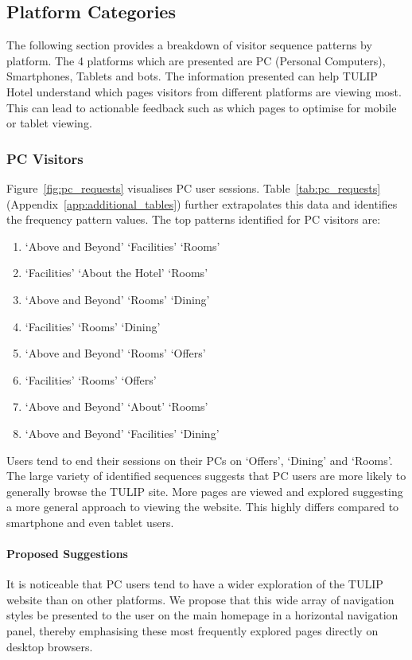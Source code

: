 \subsection{Platform Categories}
\label{sec:results:platform}

The following section provides a breakdown of visitor sequence patterns by platform. The 4 platforms which are presented are PC (Personal Computers), Smartphones, Tablets and bots. The information presented can help TULIP Hotel understand which pages visitors from different platforms are viewing most. This can lead to actionable feedback such as which pages to optimise for mobile or tablet viewing.

\subsubsection{PC Visitors}
\label{sec:results:platform:pc}

Figure~\ref{fig:pc_requests} visualises PC user sessions. Table~\ref{tab:pc_requests}  (Appendix~\ref{app:additional_tables}) further extrapolates this data and identifies the frequency pattern values. The top patterns identified for PC visitors are:

\begin{enumerate}
  \item `Above and Beyond' \ra{} `Facilities' \ra{} `Rooms'
  \item `Facilities' \ra{} `About the Hotel' \ra{} `Rooms'
  \item `Above and Beyond' \ra{} `Rooms' \ra{} `Dining'
  \item `Facilities' \ra{} `Rooms' \ra{} `Dining'
  \item `Above and Beyond' \ra{} `Rooms' \ra{} `Offers'
  \item `Facilities' \ra{} `Rooms' \ra{} `Offers'
  \item `Above and Beyond' \ra{} `About' \ra{} `Rooms'
  \item `Above and Beyond' \ra{} `Facilities' \ra{} `Dining'
\end{enumerate}

Users tend to end their sessions on their PCs on `Offers', `Dining' and `Rooms'. The large variety of identified sequences suggests that PC users are more likely to generally browse the TULIP site. More pages are viewed and explored suggesting a more general approach to viewing the website. This highly differs compared to smartphone and even tablet users.

\paragraph{Proposed Suggestions} It is noticeable that PC users tend to have a wider exploration of the TULIP website than on other platforms. We propose that this wide array of navigation styles be presented to the user on the main homepage in a horizontal navigation panel, thereby emphasising these most frequently explored pages directly on desktop browsers.

